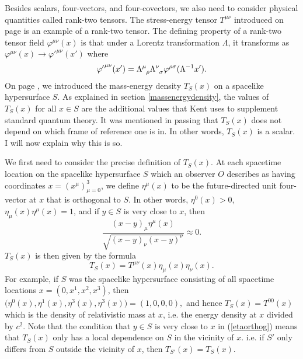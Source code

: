 Besides scalars, four-vectors, and four-covectors, we also need to consider physical quantities called rank-two tensors. The stress-energy tensor $T^{\mu\nu}$ introduced on page \pageref{stressenergy} is an example of a rank-two tensor. The defining property of a rank-two tensor field $\varphi^{\mu\nu}(x)$ is that under a Lorentz transformation $\Lambda$, it transforms as $\varphi^{\mu\nu}(x)\rightarrow{\varphi'}^{\mu\nu}(x')$ where
\begin{equation}\label{lorentztensor}
{\varphi'}^{\mu\nu}(x')=\Lambda\indices{^\mu_\rho}\Lambda\indices{^\nu_\sigma}\varphi^{\rho\sigma}(\Lambda^{-1}x').
\end{equation}
On page \pageref{massenergydensity}, we introduced the mass-energy density $T_S(x)$ on a spacelike hypersurface $S$. As explained in section \ref{massenergydensity}, the values of $T_S(x)$ for all $x\in S$ are the additional values that Kent uses to supplement standard quantum theory.  It was mentioned in passing that $T_S(x)$ does not depend on which frame of reference one is in. In other words, $T_S(x)$ is a scalar. I will now explain why this is so. 

We first need to consider the precise definition of $T_S(x)$. At each spacetime location on the spacelike hypersurface $S$ which an observer $O$ describes as having coordinates $x=(x^\mu)_{\mu=0}^3$, we define  $\eta^\mu(x)$ to be the future-directed  unit four-vector at $x$ that is orthogonal to $S$. In other words, $\eta^0(x)>0$, $\eta_\mu(x)\eta^\mu(x)=1$, and if $y\in S$ is very close to $x$, then 
\begin{equation}\label{etaorthog}
\frac{(x-y)_\mu\eta^\mu(x)}{\sqrt{(x-y)_\nu(x-y)^\nu}}\approx 0.
\end{equation}$T_S(x)$ is then given by the formula 
\begin{equation}\label{TSdef}
T_S(x)=T^{\mu\nu}(x)\eta_{\mu}(x)\eta_{\nu}(x).
\end{equation}
For example, if $S$ was the spacelike hypersurface consisting of all spacetime locations $x = (0,x^1,x^2,x^3)$, then $\big(\eta^{0}(x),\eta^{1}(x),\eta^{3}(x),\eta^{3}(x)\big) =(1,0,0,0),$ and hence $T_S(x)=T^{00}(x)$ which is the density of relativistic mass at $x$, i.e. the energy density at $x$ divided by $c^2$. Note that the condition that $y\in S$ is very close to $x$ in (\ref{etaorthog}) means that $T_S(x)$ only has a local dependence \label{localdependenceS} on $S$ in the vicinity of $x$. i.e. if $S'$ only differs from $S$ outside the vicinity of $x$, then  $T_{S'}(x)=T_S(x).$

